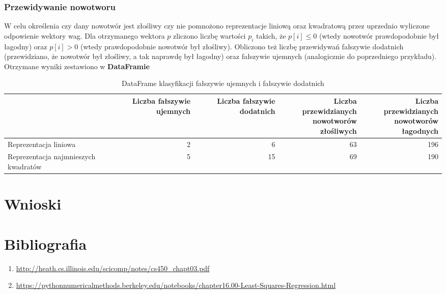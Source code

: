\documentclass{article}
\begin{document}
\subsubsection{Przewidywanie nowotworu}

W celu określenia czy dany nowotwór jest złośliwy czy nie pomnożono reprezentacje liniową oraz kwadratową przez uprzednio wyliczone odpowienie wektory wag. Dla otrzymanego wektora $p$ zliczono liczbę wartości $p_i$ takich, że $p[i]\leq0$ (wtedy nowotwór prawdopodobnie był łagodny) oraz $p[i]>0$ (wtedy prawdopodobnie nowotwór był złośliwy). Obliczono też liczbę przewidywań fałszywie dodatnich (przewidziano, że nowotwór był złośliwy, a tak naprawdę był łagodny) oraz fałszywie ujemnych (analogicznie do poprzedniego przykładu). Otrzymane wyniki zestawiono w \textbf{DataFramie}
\begin{table}[!h]
    \begin{adjustbox}{width=420pt,center}
    \centering
    \begin{tabular}{l|r|r|r|r}
    \toprule
     & Liczba fałszywie ujemnych & Liczba fałszywie dodatnich & \shortstack{Liczba przewidzianych \\ nowotworów złośliwych} & \shortstack{Liczba przewidzianych \\ nowotworów łagodnych} \\
    \midrule
    Reprezentacja liniowa & 2 & 6 & 63 & 196 \\
    Reprezentacja najmnieszych kwadratów & 5 & 15 & 69 & 190 \\
    \bottomrule
    \end{tabular}
    \end{adjustbox}
    \caption{DataFrame klasyfikacji fałszywie ujemnych i fałszywie dodatnich}
    \label{tab:my_label}
\end{table}

\section{Wnioski}





\section{Bibliografia}

\begin{enumerate}
    \item \url{http://heath.cs.illinois.edu/scicomp/notes/cs450_chapt03.pdf}
    \item \url{https://pythonnumericalmethods.berkeley.edu/notebooks/chapter16.00-Least-Squares-Regression.html}
\end{enumerate}
\end{document}
